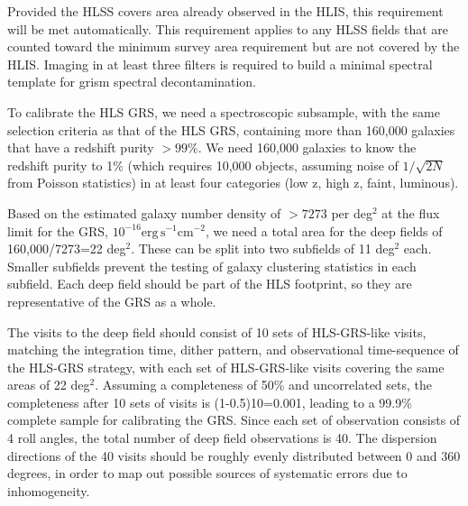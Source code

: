 

 Provided the HLSS covers area already observed in the HLIS, this
 requirement will be met automatically.  This requirement applies to any HLSS
 fields that are counted toward the minimum survey area requirement but are not
 covered by the HLIS.  Imaging in at least three filters is required to build a
 minimal spectral template for grism spectral decontamination.


To calibrate the HLS GRS, we need a spectroscopic subsample, with the same selection criteria as that of the HLS GRS, containing more than 160,000 galaxies  that have a redshift purity $>99\%$. We need 160,000 galaxies to know the redshift purity to 1\% (which requires 10,000 objects, assuming noise of $1/\sqrt{2N}$ from Poisson statistics) in at least four categories (low z, high z, faint, luminous).

Based on the estimated galaxy number density of $>7273$ per deg$^2$ at the flux limit for the GRS, $10^{-16} \mathrm{erg} \, \mathrm{s}^{-1}\mathrm{cm}^{-2}$, we need a total area for the deep fields of 160,000/7273=22 deg$^2$.  These can be split into two subfields of 11 deg$^2$ each.  Smaller subfields prevent the testing of galaxy clustering statistics in each subfield. Each deep field should be part of the HLS footprint, so they are representative of the GRS as a whole.

 The visits to the deep field should consist of 10 sets of HLS-GRS-like visits,
 matching the integration time, dither pattern, and observational time-sequence
 of the HLS-GRS strategy, with each set of HLS-GRS-like visits covering the same
 areas of 22 deg$^2$. Assuming a completeness of 50\% and uncorrelated sets, the
 completeness after 10 sets of visits is (1-0.5)10=0.001, leading to a 99.9\%
 complete sample for calibrating the GRS. Since each set of observation consists
 of 4 roll angles, the total number of deep field observations is 40. The
 dispersion directions of the 40 visits should be roughly evenly distributed
 between 0 and 360 degrees, in order to map out possible sources of systematic
 errors due to inhomogeneity.

